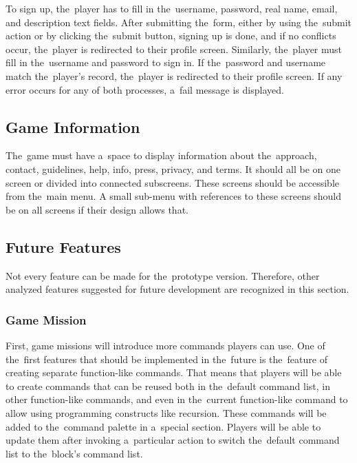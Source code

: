To sign up, the~player has to fill in the~username, password, real name, email, and description text fields.
After submitting the~form, either by using the~submit action or by clicking the~submit button, signing up is done, and if no conflicts occur, the~player is redirected to their profile screen.
Similarly, the~player must fill in the~username and password to sign in.
If the~password and username match the~player's record, the~player is redirected to their profile screen.
If any error occurs for any of both processes, a~fail message is displayed.

\subsection{Game Information}
\label{analysis:game:game-information}

The~game must have a~space to display information about the~approach, contact, guidelines, help, info, press, privacy, and terms.
It should all be on one screen or divided into connected subscreens.
These screens should be accessible from the~main menu.
A small sub-menu with references to these screens should be on all screens if their design allows that.

\subsection{Future Features}
\label{analysis:game:future-features}

Not every feature can be made for the~prototype version.
Therefore, other analyzed features suggested for future development are recognized in this section.

\subsubsection{Game Mission}

First, game missions will introduce more commands players can use.
One of the~first features that should be implemented in the~future is the~feature of creating separate function-like commands.
That means that players will be able to create commands that can be reused both in the~default command list, in other function-like commands, and even in the~current function-like command to allow using programming constructs like recursion.
These commands will be added to the~command palette in a~special section.
Players will be able to update them after invoking a~particular action to switch the~default command list to the~block's command list.

